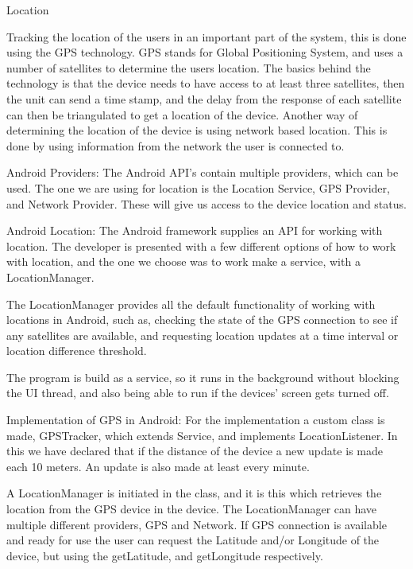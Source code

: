 

Location

Tracking the location of the users in an important part of the system, this is done using the GPS technology.
GPS stands for Global Positioning System, and uses a number of satellites to determine the users location.
The basics behind the technology is that the device needs to have access to at least three satellites, then the unit can send a time stamp, and the delay from the response of each satellite can then be triangulated to get a location of the device.
Another way of determining the location of the device is using network based location. This is done by using information from the network the user is connected to.


Android Providers:
The Android API's contain multiple providers, which can be used. The one we are using for location is the Location Service, GPS Provider, and Network Provider. These will give us access to the device location and status.


Android Location:
The Android framework supplies an API for working with location.
The developer is presented with a few different options of how to work with location, and the one we choose was to work make a service, with a LocationManager.

The LocationManager provides all the default functionality of working with locations in Android, such as, checking the state of the GPS connection to see if any satellites are available, and requesting location updates at a time interval or location difference threshold.



The program is build as a service, so it runs in the background without blocking the UI thread, and also being able to run if the devices' screen gets turned off.


Implementation of GPS in Android:
For the implementation a custom class is made, GPSTracker, which extends Service, and implements LocationListener.
In this we have declared that if the distance of the device a new update is made each 10 meters. An update is also made at least every minute.

A LocationManager is initiated in the class, and it is this which retrieves the location from the GPS device in the device. The LocationManager can have multiple different providers, GPS and Network.
If GPS connection is available and ready for use the user can request the Latitude and/or Longitude of the device, but using the getLatitude, and getLongitude respectively.

